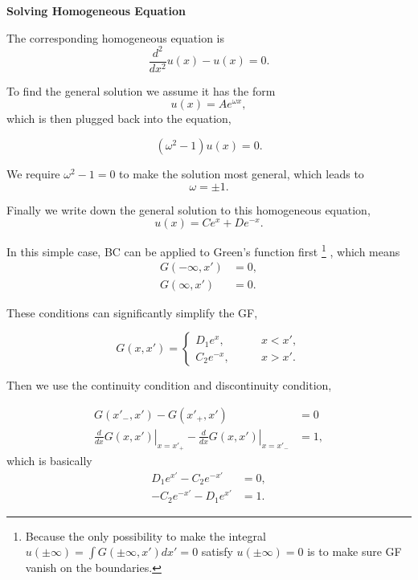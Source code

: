 \begin{framed}
{\bf Solving Homogeneous Equation}

The corresponding homogeneous equation is
\begin{equation*}
    \frac{d^2}{dx^2} u(x) - u(x) = 0.
\end{equation*}

To find the general solution we assume it has the form
\begin{equation*}
    u(x) = A e^{\omega x},
\end{equation*}
which is then plugged back into the equation,

\begin{equation*}
    (\omega^2 - 1) u(x) = 0.
\end{equation*}

We require $\omega^2-1=0$ to make the solution most general, which leads to
\begin{equation*}
    \omega = \pm 1.
\end{equation*}

Finally we write down the general solution to this homogeneous equation,
\begin{equation*}
    u(x) = C e^{x} + D e^{-x}.
\end{equation*}

\end{framed}

In this simple case, BC can be applied to Green's function first
\footnote{Because the only possibility to make the integral $u(\pm\infty)=\int G(\pm\infty,x') dx'=0$ satisfy $u(\pm\infty)=0$ is to make sure GF vanish on the boundaries.}
, which means
\begin{align*}
    G(-\infty,x') &= 0, \\
    G(\infty,x') &= 0.
\end{align*}

These conditions can significantly simplify the GF,

\begin{equation*}
    G(x,x') = \begin{cases}
    D_1 e^{x}, & \qquad x<x',\\
    C_2 e^{-x}, & \qquad x>x'.
    \end{cases}
\end{equation*}

Then we use the continuity condition and discontinuity condition,

\begin{align*}
    G(x'_-,x') - G(x'_+,x') &= 0\\
    \left.\frac{d}{dx}G(x,x')\right\vert_{x=x'_+} - \left.\frac{d}{dx}G(x,x')\right\vert_{x=x'_-} &= 1,
\end{align*}
which is basically
\begin{align*}
    D_1 e^{x'} - C_2 e^{-x'} &= 0,\\
    - C_2 e^{-x'} - D_1 e^{x'} & =1.
\end{align*}

